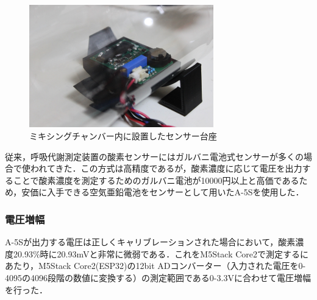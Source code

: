\begin{figure}[H]
  \begin{center}
    \includegraphics[width=8cm]{fig/sensor_board}
    \caption{ミキシングチャンバー内に設置したセンサー台座}
    \label{fig:sensor_board}
  \end{center}
\end{figure}

従来，呼吸代謝測定装置の酸素センサーにはガルバニ電池式センサーが多くの場合で使われてきた．この方式は高精度であるが，酸素濃度に応じて電圧を出力することで酸素濃度を測定するためのガルバニ電池が10000円以上と高価であるため，安価に入手できる空気亜鉛電池をセンサーとして用いたA-5Sを使用した．

\subsubsection{電圧増幅}
\label{sec:opamp}

A-5Sが出力する電圧は正しくキャリブレーションされた場合において，酸素濃度20.93\%時に20.93mVと非常に微弱である．これをM5Stack Core2で測定するにあたり，M5Stack Core2(ESP32)の12bit ADコンバーター（入力された電圧を0-4095の4096段階の数値に変換する）の測定範囲である0-3.3Vに合わせて電圧増幅を行った．

